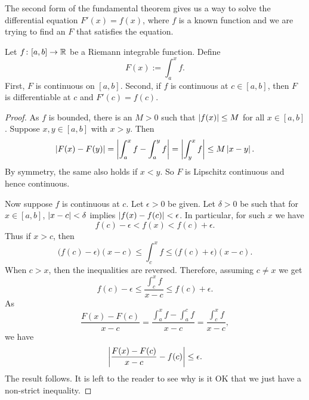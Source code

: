 The second form of the fundamental theorem gives us a way to solve
the differential equation $F'(x) = f(x)$, where $f$ is a known
function and we are trying to find an $F$ that satisfies the equation.

\begin{thm} \label{thm:FTCv2}
Let $f \colon [a,b] \to {\mathbb{R}}$ be a Riemann integrable function.  Define
\begin{equation*}
F(x) := \int_a^x f .
\end{equation*}
First, $F$ is continuous on $[a,b]$.  Second,
if $f$ is continuous at $c \in [a,b]$, then $F$ is differentiable at $c$
and $F'(c) = f(c)$.
\end{thm}

\begin{proof}
As $f$ is bounded, there is an $M > 0$
such that $\left\lvert {f(x)} \right\rvert \leq M$ for all $x \in [a,b]$.  Suppose $x,y \in [a,b]$
with $x > y$.  Then
\begin{equation*}
\left\lvert {F(x)-F(y)} \right\rvert =
\left\lvert {\int_a^x f - \int_a^y f} \right\rvert
=
\left\lvert {\int_y^x f} \right\rvert
\leq
M\left\lvert {x-y} \right\rvert .
\end{equation*}
By symmetry, the same also holds if $x < y$.
So $F$ is Lipschitz continuous and hence continuous.

Now suppose $f$ is continuous at $c$.
Let $\epsilon > 0$ be given.  Let $\delta > 0$ be such that
for $x \in [a,b]$,
$\left\lvert {x-c} \right\rvert < \delta$ implies $\left\lvert {f(x)-f(c)} \right\rvert < \epsilon$.
In particular,
for such $x$ we have
\begin{equation*}
f(c)-\epsilon < f(x) < f(c) + \epsilon.
\end{equation*}
Thus if $x > c$, then
\begin{equation*}
\bigl(f(c)-\epsilon\bigr) (x-c) \leq \int_c^x f \leq
\bigl(f(c) + \epsilon\bigr)(x-c).
\end{equation*}
When $c > x$, then the inequalities are reversed.  Therefore,
assuming $c \not= x$ we get
\begin{equation*}
f(c)-\epsilon
\leq
\frac{\int_c^{x} f}{x-c}
\leq
f(c)+\epsilon .
\end{equation*}
As 
\begin{equation*}
\frac{F(x)-F(c)}{x-c}
=
\frac{\int_a^{x} f - \int_a^{c} f}{x-c}
=
\frac{\int_c^{x} f}{x-c} ,
\end{equation*}
we have 
\begin{equation*}
\left\lvert {\frac{F(x)-F(c)}{x-c} - f(c)} \right\rvert \leq \epsilon .
\end{equation*}
The result follows.  It is left to the reader to see why is it OK that we
just have a non-strict inequality.
\end{proof}

